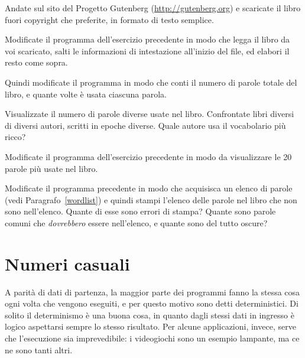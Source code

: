 \documentclass[10pt]{book}
\begin{document}
\vspace{0.2in}
\begin{exercise}

Andate sul sito del Progetto Gutenberg (\url{http://gutenberg.org}) e scaricate il libro fuori copyright che preferite, in formato di testo semplice.

Modificate il programma dell'esercizio precedente in modo che legga il libro da voi scaricato, salti le informazioni di intestazione all'inizio del file, ed elabori il resto come sopra.

Quindi modificate il programma in modo che conti il numero di parole totale del libro, e quante volte è usata ciascuna parola.

Visualizzate il numero di parole diverse usate nel libro. Confrontate libri diversi di diversi autori, scritti in epoche diverse. Quale autore usa il vocabolario più ricco?
\end{exercise}

\vspace{0.2in}
\begin{exercise}

Modificate il programma dell'esercizio precedente in modo da visualizzare le 20 parole più usate nel libro.

\end{exercise}

\vspace{0.2in}
\begin{exercise}

Modificate il programma precedente in modo che acquisisca un elenco di parole (vedi Paragrafo~\ref{wordlist}) e quindi stampi l'elenco delle parole nel libro che non sono nell'elenco. Quante di esse sono errori di stampa? Quante sono parole comuni che {\em dovrebbero} essere nell'elenco, e quante sono del tutto oscure?

\end{exercise}


\section{Numeri casuali}

A parità di dati di partenza, la maggior parte dei programmi fanno la stessa cosa ogni volta che vengono eseguiti, e per questo motivo sono detti  deterministici. Di solito il determinismo è una buona cosa, in quanto dagli stessi dati in ingresso è logico aspettarsi sempre lo stesso risultato. Per alcune applicazioni, invece, serve che l'esecuzione sia imprevedibile: i videogiochi sono un esempio lampante, ma ce ne sono tanti altri.
\end{document}
